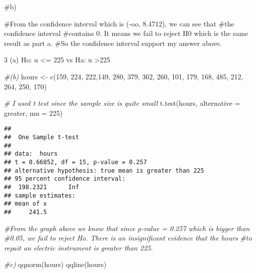 \documentclass[
]{article}
\newenvironment{Shaded}{\begin{snugshade}}{\end{snugshade}}
\newcommand{\AttributeTok}[1]{\textcolor[rgb]{0.77,0.63,0.00}{#1}}
\newcommand{\CommentTok}[1]{\textcolor[rgb]{0.56,0.35,0.01}{\textit{#1}}}
\newcommand{\DecValTok}[1]{\textcolor[rgb]{0.00,0.00,0.81}{#1}}
\newcommand{\FunctionTok}[1]{\textcolor[rgb]{0.00,0.00,0.00}{#1}}
\newcommand{\NormalTok}[1]{#1}
\newcommand{\OtherTok}[1]{\textcolor[rgb]{0.56,0.35,0.01}{#1}}
\newcommand{\StringTok}[1]{\textcolor[rgb]{0.31,0.60,0.02}{#1}}
\begin{document}
\#b)

\#From the confidence interval which is (-oo, 8.4712), we can see that
\#the confidence interval \#contains 0. It means we fail to reject H0
which is the same result as part a. \#So the confidence interval support
my answer above.

3 (a) Ho: u \textless= 225 vs Ha: u \textgreater225

\begin{Shaded}
\begin{Highlighting}[]
\CommentTok{\#(b)}
\NormalTok{hours }\OtherTok{\textless{}{-}} \FunctionTok{c}\NormalTok{(}\DecValTok{159}\NormalTok{, }\DecValTok{224}\NormalTok{, }\DecValTok{222}\NormalTok{,}\DecValTok{149}\NormalTok{, }\DecValTok{280}\NormalTok{, }\DecValTok{379}\NormalTok{, }\DecValTok{362}\NormalTok{, }\DecValTok{260}\NormalTok{, }\DecValTok{101}\NormalTok{, }\DecValTok{179}\NormalTok{, }\DecValTok{168}\NormalTok{, }\DecValTok{485}\NormalTok{, }\DecValTok{212}\NormalTok{, }\DecValTok{264}\NormalTok{,}
           \DecValTok{250}\NormalTok{, }\DecValTok{170}\NormalTok{)}


\CommentTok{\# I used t test since the sample size is quite small}
\FunctionTok{t.test}\NormalTok{(hours, }\AttributeTok{alternative =} \StringTok{\textquotesingle{}greater\textquotesingle{}}\NormalTok{, }\AttributeTok{mu =} \DecValTok{225}\NormalTok{)}
\end{Highlighting}
\end{Shaded}

\begin{verbatim}
## 
##  One Sample t-test
## 
## data:  hours
## t = 0.66852, df = 15, p-value = 0.257
## alternative hypothesis: true mean is greater than 225
## 95 percent confidence interval:
##  198.2321      Inf
## sample estimates:
## mean of x 
##     241.5
\end{verbatim}

\begin{Shaded}
\begin{Highlighting}[]
\CommentTok{\#From the graph above we know that since p{-}value = 0.257 which is bigger than }
\CommentTok{\#0.05, we fail to reject Ho. There is an insignificant evidence that the hours }
\CommentTok{\#to repait an electric instrument is greater than 225.}




\CommentTok{\#c)}
\FunctionTok{qqnorm}\NormalTok{(hours)}
\FunctionTok{qqline}\NormalTok{(hours)}
\end{Highlighting}
\end{Shaded}
\end{document}
